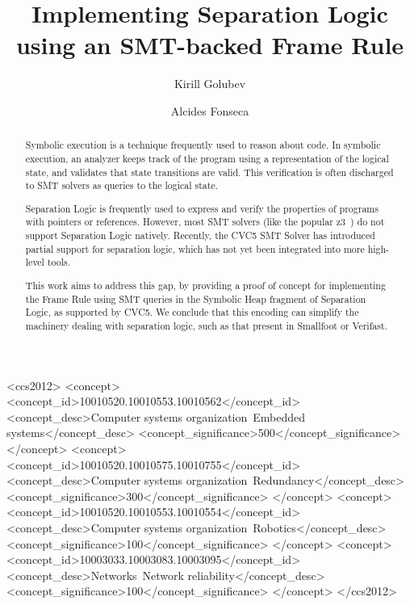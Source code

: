 \documentclass[sigplan,screen,review]{acmart}
\begin{document}
\title{Implementing Separation Logic using an SMT-backed Frame Rule}

\author{Kirill Golubev}
\author{Alcides Fonseca}

\begin{abstract}

Symbolic execution is a technique frequently used to reason about code. In symbolic execution, an analyzer keeps track of the program using a representation of the logical state, and validates that state transitions are valid. This verification is often discharged to SMT solvers as queries to the logical state.

Separation Logic is frequently used to express and verify the properties of programs with pointers or references. However, most SMT solvers (like the popular z3~\cite{moura2008z3}) do not support Separation Logic natively. Recently, the CVC5 SMT Solver has introduced partial support for separation logic, which has not yet been integrated into more high-level tools.

This work aims to address this gap, by providing a proof of concept for implementing the Frame Rule using SMT queries in the Symbolic Heap fragment of Separation Logic, as supported by CVC5. We conclude that this encoding can simplify the machinery dealing with separation logic, such as that present in Smallfoot or Verifast.

\end{abstract}

\begin{CCSXML}
<ccs2012>
 <concept>
  <concept_id>10010520.10010553.10010562</concept_id>
  <concept_desc>Computer systems organization~Embedded systems</concept_desc>
  <concept_significance>500</concept_significance>
 </concept>
 <concept>
  <concept_id>10010520.10010575.10010755</concept_id>
  <concept_desc>Computer systems organization~Redundancy</concept_desc>
  <concept_significance>300</concept_significance>
 </concept>
 <concept>
  <concept_id>10010520.10010553.10010554</concept_id>
  <concept_desc>Computer systems organization~Robotics</concept_desc>
  <concept_significance>100</concept_significance>
 </concept>
 <concept>
  <concept_id>10003033.10003083.10003095</concept_id>
  <concept_desc>Networks~Network reliability</concept_desc>
  <concept_significance>100</concept_significance>
 </concept>
</ccs2012>
\end{CCSXML}
\end{document}
